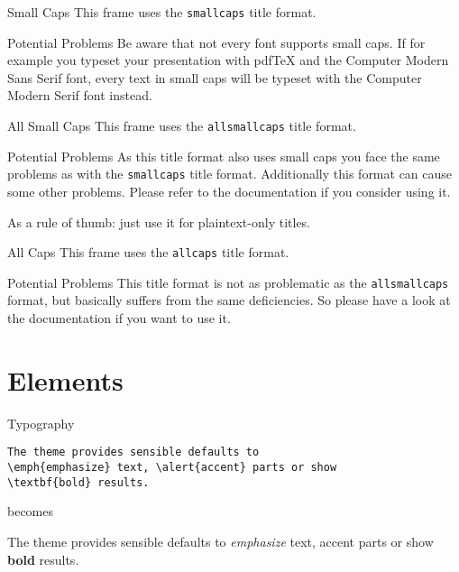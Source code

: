 \documentclass[10pt]{beamer}
\begin{document}
{
\begin{frame}{Small Caps}
  This frame uses the \texttt{smallcaps} title format.

  \begin{alertblock}{Potential Problems}
    Be aware that not every font supports small caps. If for example you typeset your presentation with pdfTeX and the Computer Modern Sans Serif font, every text in small caps will be typeset with the Computer Modern Serif font instead.
  \end{alertblock}
\end{frame}
}

{
\begin{frame}{All Small Caps}
  This frame uses the \texttt{allsmallcaps} title format.

  \begin{alertblock}{Potential Problems}
    As this title format also uses small caps you face the same problems as with the \texttt{smallcaps} title format. Additionally this format can cause some other problems. Please refer to the documentation if you consider using it.

    \medskip

    As a rule of thumb: just use it for plaintext-only titles.
  \end{alertblock}
\end{frame}
}

{
\begin{frame}{All Caps}
  This frame uses the \texttt{allcaps} title format.

  \begin{alertblock}{Potential Problems}
    This title format is not as problematic as the \texttt{allsmallcaps} format, but basically suffers from the same deficiencies. So please have a look at the documentation if you want to use it.
  \end{alertblock}
\end{frame}
}

\section{Elements}

\begin{frame}[fragile]{Typography}
  \begin{verbatim}The theme provides sensible defaults to
\emph{emphasize} text, \alert{accent} parts or show
\textbf{bold} results.\end{verbatim}
  \begin{center}
    becomes
  \end{center}
  The theme provides sensible defaults to \emph{emphasize} text,
  \alert{accent} parts or show \textbf{bold} results.
\end{frame}
\end{document}
